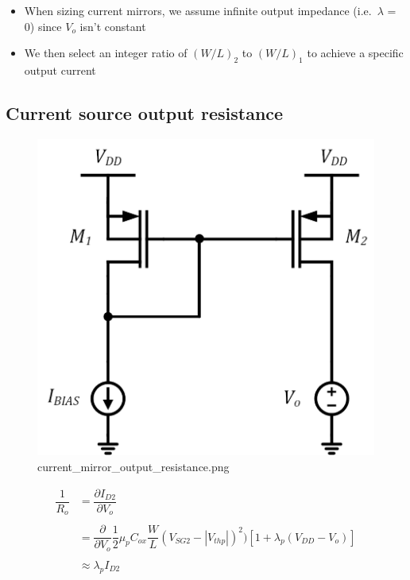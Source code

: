 \documentclass[11pt]{article}
\providecommand{\tightlist}{%
      \setlength{\itemsep}{0pt}\setlength{\parskip}{0pt}}
\begin{document}
    \begin{itemize}
\tightlist
\item
  When sizing current mirrors, we assume infinite output impedance
  (i.e.~\(\lambda\) = 0) since \(V_o\) isn't constant
\item
  We then select an integer ratio of \((W/L)_2\) to \((W/L)_1\) to
  achieve a specific output current
\end{itemize}

    \hypertarget{current-source-output-resistance}{%
\subsection{Current source output
resistance}\label{current-source-output-resistance}}

    \begin{figure}
\centering
\includegraphics{current_mirror_output_resistance.png}
\caption{current\_mirror\_output\_resistance.png}
\end{figure}

    \begin{align}
\dfrac{1}{R_o} &= \dfrac{\partial I_{D2}}{\partial V_o}\\
\\
&= \dfrac{\partial}{\partial V_o} \dfrac{1}{2} \mu_p C_{ox} \dfrac{W}{L}(V_{SG2} - |V_{thp}|)^2)[1+\lambda_p(V_{DD} - V_o)]\\
\\
&\approx \lambda_p I_{D2} 
\end{align}
\end{document}

